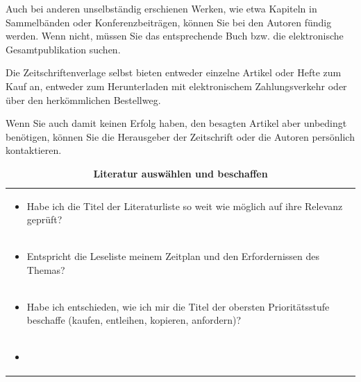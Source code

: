 \documentclass[]{book}
\providecommand{\tightlist}{%
  \setlength{\itemsep}{0pt}\setlength{\parskip}{0pt}}
\theoremstyle{definition}
\theoremstyle{definition}
\theoremstyle{definition}
\theoremstyle{remark}
\begin{document}
Auch bei anderen unselbständig erschienen Werken, wie etwa Kapiteln in
Sammelbänden oder Konferenzbeiträgen, können Sie bei den Autoren fündig
werden. Wenn nicht, müssen Sie das entsprechende Buch bzw. die
elektronische Gesamtpublikation suchen.

Die Zeitschriftenverlage selbst bieten entweder einzelne Artikel oder
Hefte zum Kauf an, entweder zum Herunterladen mit elektronischem
Zahlungsverkehr oder über den herkömmlichen Bestellweg.

Wenn Sie auch damit keinen Erfolg haben, den besagten Artikel aber
unbedingt benötigen, können Sie die Herausgeber der Zeitschrift oder die
Autoren persönlich kontaktieren.

\begin{longtable}[]{@{}l@{}}
\caption{\textbf{\label{tab:literatur-beschaffen} Literatur auswählen und
beschaffen}}\tabularnewline
\toprule
\begin{minipage}[t]{0.97\columnwidth}\raggedright\strut
\begin{itemize}
\tightlist
\item
  Habe ich die Titel der Literaturliste so weit wie möglich auf ihre
  Relevanz geprüft? \vspace{-6mm}
\end{itemize}\strut
\end{minipage}\tabularnewline
\begin{minipage}[t]{0.97\columnwidth}\raggedright\strut
\begin{itemize}
\tightlist
\item
  Entspricht die Leseliste meinem Zeitplan und den Erfordernissen des
  Themas? \vspace{-6mm}
\end{itemize}\strut
\end{minipage}\tabularnewline
\begin{minipage}[t]{0.97\columnwidth}\raggedright\strut
\begin{itemize}
\tightlist
\item
  Habe ich entschieden, wie ich mir die Titel der obersten
  Prioritätsstufe beschaffe (kaufen, entleihen, kopieren,
  anfordern)?\vspace{-6mm}
\end{itemize}\strut
\end{minipage}\tabularnewline
\begin{minipage}[t]{0.97\columnwidth}\raggedright\strut
\begin{itemize}
\tightlist
\item

\end{itemize}
\end{minipage}
\end{longtable}
\end{document}

